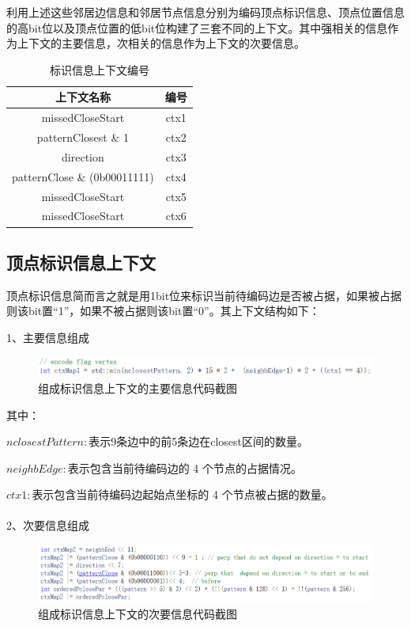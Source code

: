 \documentclass[bachelor,print,msfonts]{xduthesis}
\begin{document}
利用上述这些邻居边信息和邻居节点信息分别为编码顶点标识信息、顶点位置信息的高bit位以及顶点位置的低bit位构建了三套不同的上下文。其中强相关的信息作为上下文的主要信息，次相关的信息作为上下文的次要信息。
\begin{table}[h]
    \fontsize{10.5pt}{15pt}\selectfont
    \centering
    \caption{\label{tab1} 标识信息上下文编号}
    \begin{tabular}{cc}
        \toprule
        上下文名称                   & 编号 \\
        \midrule
        missedCloseStart             & ctx1 \\
        patternClosest  \& 1         & ctx2 \\
        direction                    & ctx3 \\
        patternClose \& (0b00011111) & ctx4 \\
        missedCloseStart             & ctx5 \\
        missedCloseStart             & ctx6 \\
        \bottomrule
    \end{tabular}
\end{table}

\subsection{顶点标识信息上下文}
顶点标识信息简而言之就是用1bit位来标识当前待编码边是否被占据，如果被占据则该bit置“1”，如果不被占据则该bit置“0”。其上下文结构如下：

1、主要信息组成
\begin{figure}[htbp]
    \centering
    \includegraphics[scale=0.4]{image/flag主要信息组成.png}
    \caption{组成标识信息上下文的主要信息代码截图}
    \label{fig:flag主要信息组成}
\end{figure}

其中：

$nclosestPattern:$表示9条边中的前5条边在closest区间的数量。

$neighbEdge:$表示包含当前待编码边的 4 个节点的占据情况。

$ctx1:$表示包含当前待编码边起始点坐标的 4 个节点被占据的数量。
\\
\\
2、次要信息组成
\begin{figure}[htbp]
    \centering
    \includegraphics[scale=0.4]{image/flag次要信息组成.png}
    \caption{组成标识信息上下文的次要信息代码截图}
    \label{fig:flag次要信息组成}
\end{figure}
\end{document}

